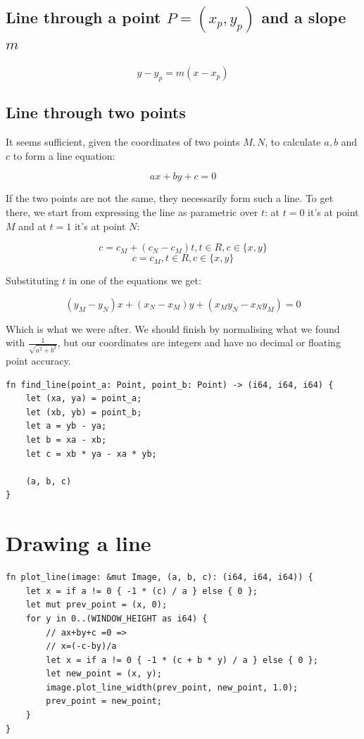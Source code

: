 \documentclass[12pt,openany,a4,usenames,dvipsnames]{book}
\begin{document}

\section{Line through a point $P=(x_p,y_p)$ and a slope $m$}

$$y-y_p=m(x-x_p)$$

\section{Line through two points}\label{sec:linethroughtwopoints}
\begin{figure}[H]
\centering

\end{figure}
It seems sufficient, given the coordinates of two points $M, N$, to calculate $a, b$ and $c$ to form a line equation:

$$ax+by+c=0$$

If the two points are not the same, they necessarily form such a line. To get there, we start from expressing the line as parametric over $t$: at $t=0$ it's at point $M$ and at $t=1$ it's at point $N$:

$$c = c_M + (c_N - c_M)t, t\in R, c \in \{x, y\}$$
$$c = c_M, t\in R, c \in \{x, y\}$$

Substituting $t$ in one of the equations we get:

$$(y_M - y_N)x + (x_N-x_M)y+(x_{M}y_{N}-x_{N}y_{M})=0$$

Which is what we were after. We should finish by normalising what we found with $\frac{1}{\sqrt{a^2+b^2}}$, but our coordinates are integers and have no decimal or floating point accuracy.

\begin{verbatim}
fn find_line(point_a: Point, point_b: Point) -> (i64, i64, i64) {
    let (xa, ya) = point_a;
    let (xb, yb) = point_b;
    let a = yb - ya;
    let b = xa - xb;
    let c = xb * ya - xa * yb;

    (a, b, c)
}
\end{verbatim}
%
%
%
\chapter{Drawing a line}
\begin{verbatim}
fn plot_line(image: &mut Image, (a, b, c): (i64, i64, i64)) {
    let x = if a != 0 { -1 * (c) / a } else { 0 };
    let mut prev_point = (x, 0);
    for y in 0..(WINDOW_HEIGHT as i64) {
        // ax+by+c =0 =>
        // x=(-c-by)/a
        let x = if a != 0 { -1 * (c + b * y) / a } else { 0 };
        let new_point = (x, y);
        image.plot_line_width(prev_point, new_point, 1.0);
        prev_point = new_point;
    }
}
\end{verbatim}
%
%
%
\end{document}
